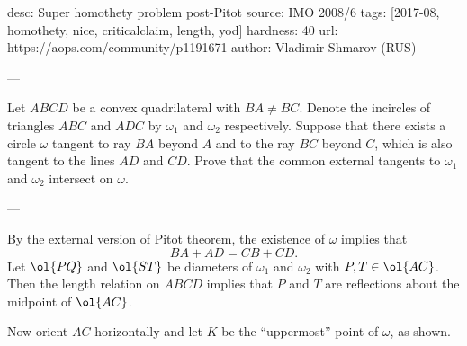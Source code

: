 desc: Super homothety problem post-Pitot
source: IMO 2008/6
tags: [2017-08, homothety, nice, criticalclaim, length, yod]
hardness: 40
url: https://aops.com/community/p1191671
author: Vladimir Shmarov (RUS)

---

Let $ABCD$ be a convex quadrilateral with $BA \neq BC$.
Denote the incircles of triangles $ABC$ and $ADC$
by $\omega_1$ and $\omega_2$ respectively.
Suppose that there exists a circle $\omega$ tangent
to ray $BA$ beyond $A$ and to the ray $BC$ beyond $C$,
which is also tangent to the lines $AD$ and $CD$.
Prove that the common external tangents to
$\omega_1$ and $\omega_2$ intersect on $\omega$.

---

By the external version of Pitot theorem, the existence
of $\omega$ implies that
\[ BA + AD = CB + CD. \]
Let $\ol{PQ}$ and $\ol{ST}$ be diameters of $\omega_1$ and $\omega_2$
with $P, T \in \ol{AC}$.
Then the length relation on $ABCD$ implies that $P$ and $T$
are reflections about the midpoint of $\ol{AC}$.

Now orient $AC$ horizontally and let $K$ be the ``uppermost'' point of $\omega$, as shown.

